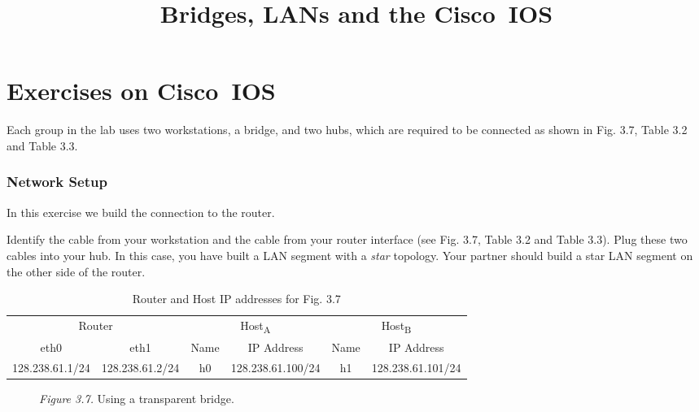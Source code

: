 \documentclass{../UTNetLab}
\title{Bridges, LANs and the Cisco~IOS}
\begin{document}
\part{Exercises on Cisco~IOS}
    Each group in the lab uses two workstations, a bridge, and two hubs, which are required to be connected as shown in Fig. 3.7, Table 3.2 and Table 3.3.

\section{Network Setup}
    In this exercise we build the connection to the router.

    Identify the cable from your workstation and the cable from your router interface (see Fig. 3.7, Table 3.2 and Table 3.3).
    Plug these two cables into your hub.
    In this case, you have built a LAN segment with a \textit{star} topology.
    Your partner should build a star LAN segment on the other side of the router.

    \begin{table}[H]
        \caption{Router and Host IP addresses for Fig. 3.7}
        \centering
        \begin{tabular}{ *2c|*2c|*2c }
            \hline \hline
            \multicolumn{2}{c|}{Router} & \multicolumn{2}{c|}{Host\textsubscript{A}} & \multicolumn{2}{c}{Host\textsubscript{B}} \\
            eth0 & eth1 & Name & IP Address & Name & IP Address \\
            \hline 
            128.238.61.1/24 & 128.238.61.2/24 & h0 & 128.238.61.100/24 & h1 & 128.238.61.101/24 \\
            \hline \hline
            \end{tabular}
    \end{table}

    \begin{figure}[H]
        \centering
        \caption{\textit{Figure 3.7.} Using a transparent bridge.}        
    \end{figure}
\end{document}
